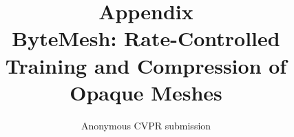 \documentclass[10pt,twocolumn,letterpaper]{article}
\title{Appendix\\[4pt]\large ByteMesh: Rate-Controlled Training and Compression of Opaque Meshes}
\author{Anonymous CVPR submission}
\begin{document}
\maketitle

{
    \small
    
    
}
\end{document}
